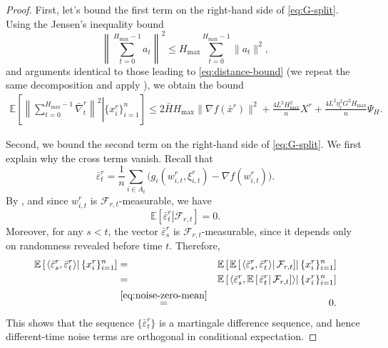 \documentclass[10pt,a4paper]{amsart}
\newcommand{\ExpCond}[2]{{\mathbb{E}}\left[\left.#1\right\vert#2\right]}
\newcommand{\anglebr}[1]{\left\langle#1\right\rangle} %
\newcommand{\cF}{\mathcal{F}}
\newcommand{\inner}[2]{\anglebr{#1, #2}}
\begin{document}
\begin{proof}
First, let's bound the first term on the right-hand side of \eqref{eq:G-split}. Using the Jensen's inequality  bound
\[
\left\|\sum_{t=0}^{H_{\max}-1} a_t\right\|^2
\le
H_{\max}\sum_{t=0}^{H_{\max}-1}\|a_t\|^2,
\]
and arguments identical to those leading to \eqref{eq:distance-bound} (we repeat the same decomposition and apply ), we obtain the bound
\begin{eqnarray}
\ExpCond{ \left\|\sum_{t=0}^{H_{\max}-1}\bar\nabla_t^r\right\|^2 }{ \{x_i^r\}_{i=1}^n }
\leq
2\bar H H_{\max}\|\nabla f(\bar x^r)\|^2
+
\frac{4L^2H_{\max}^2}{n}X^r
+
\frac{4L^2\eta_r^2G^2H_{\max}}{n}\Psi_H.
\label{eq:mean-term}
\end{eqnarray}

Second, we bound the second term on the right-hand side of \eqref{eq:G-split}. We first explain why the cross terms vanish. Recall that
\[
\bar\varepsilon_t^r
=
\frac{1}{n}\sum_{i\in A_t}
\bigl(g_i(w_{i,t}^r,\xi_{i,t}^r)-\nabla f(w_{i,t}^r)\bigr).
\]
By , and since \(w_{i,t}^r\) is \(\cF_{r,t}\)-measurable, we have
\begin{equation}
\ExpCond{\bar\varepsilon_t^r}{\cF_{r,t}} = 0.
\label{eq:noise-zero-mean}
\end{equation}
Moreover, for any \(s<t\), the vector \(\bar\varepsilon_s^r\) is \(\cF_{r,t}\)-measurable, since it depends only on randomness revealed before time \(t\). Therefore,
\begin{eqnarray}
\ExpCond{\inner{\bar\varepsilon_s^r}{\bar\varepsilon_t^r}}{\{x_i^r\}_{i=1}^n}
&=&
\ExpCond{
\ExpCond{\inner{\bar\varepsilon_s^r}{\bar\varepsilon_t^r}}{\cF_{r,t}}
}{\{x_i^r\}_{i=1}^n}
\notag\\
&=&
\ExpCond{
\inner{\bar\varepsilon_s^r}{\ExpCond{\bar\varepsilon_t^r}{\cF_{r,t}}}
}{\{x_i^r\}_{i=1}^n}
\notag\\
&\overset{\eqref{eq:noise-zero-mean}}{=}&
0.
\label{eq:cross-terms-zero}
\end{eqnarray}
This shows that the sequence \(\{\bar\varepsilon_t^r\}\) is a martingale difference sequence, and hence different-time noise terms are orthogonal in conditional expectation.


\end{proof}
\end{document}
